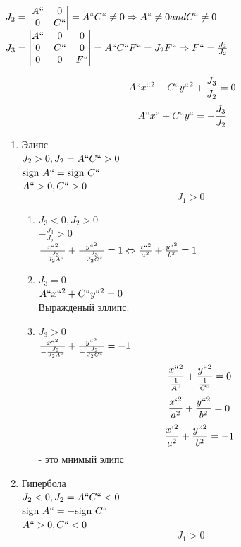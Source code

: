 \documentclass[12pt, a4paper]{article}
\newcommand{\sign}{\text{sign\ }}
\begin{document}
$ J_2 = \begin{vmatrix}
	A`` &0\\
	0&C``
\end{vmatrix} = A``C`` \not= 0 \Rightarrow A`` \not=0 and C`` \not= 0 $\\
$J_3 = \begin{vmatrix}
	A``&0&0\\
	0&C``&0\\
	0&0&F``
\end{vmatrix} = A``C``F`` = J_2 F`` \Rightarrow F`` = \frac{J_3}{J_2}$
\begin{tcolorbox}
	\[ A``x``^2 + C`` y``^2 + \frac{J_3}{J_2} = 0 \]
	\[ A``x`` + C`` y`` = -\frac{J_3}{J_2} \]
\end{tcolorbox}

\begin{enumerate}
	\item Элипс\\
		$J_2 > 0, J_2 = A``C`` > 0$\\
		$\sign A`` = \sign C``$\\
		$A`` > 0, C`` > 0$\\
		\[J_1 > 0\]
		\begin{enumerate}
			\item $J_3 < 0, J_2 > 0$\\
				$-\frac{J_3}{J_2} > 0$\\
				$\frac{x``^2}{-\frac{J_3}{J_2A``}} + \frac{y``^2}{-\frac{J_3}{J_2C``}} = 1 \Leftrightarrow \frac{x``^2}{a^2} + \frac{y``^2}{b^2} = 1$
			\item $J_3 = 0$\\
				$A``x``^2 + C``y``^2 = 0$\\
				Выражденый эллипс. \\
			\item $J_3 > 0$\\
			$\frac{x``^2}{-\frac{J_3}{J_2A``}} + \frac{y``^2}{-\frac{J_3}{J_2C``}} = -1$\\
			\[ \frac{x``^2}{\frac{1}{A``}} + \frac{y``^2}{\frac{1}{C``}} = 0 \]
			\[ \frac{x`^2}{a^2} + \frac{y``^2}{b^2} = 0 \]
			\[ \frac{x`^2}{a^2} + \frac{y``^2}{b^2} = -1 \]
			- это мнимый элипс
		\end{enumerate}
	\item Гипербола\\
		$J_2 < 0, J_2 = A``C`` < 0$\\
		$\sign A`` = -\sign C``$\\
		$A`` > 0, C`` < 0$\\
		\[J_1 > 0\]
		\begin{enumerate}

\end{enumerate}
\end{enumerate}
\end{document}
